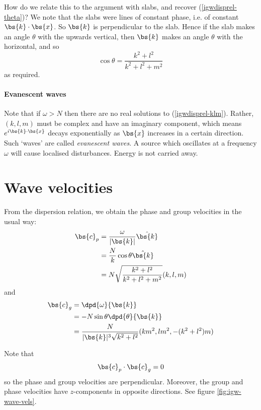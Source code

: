 How do we relate this to the argument with slabs, and recover
(\ref{igwdisprel-theta})? We note that the slabs were lines of constant phase,
i.e. of constant $\bs{k}\cdot\bs{x}$. So $\bs{k}$ is perpendicular to the slab.
Hence if the slab makes an angle $\theta$ with the upwards vertical, then
$\bs{k}$ makes an angle $\theta$ with the horizontal, and so
\begin{equation}
	\cos\theta = \frac{k^2+l^2}{k^2+l^2+m^2}
\end{equation}
as required. 

\paragraph{Evanescent waves}
Note that if $\omega > N$ then there are no real solutions to
(\ref{igwdisprel-klm}). Rather, $(k,l,m)$ must be complex and have an imaginary
component, which means $e^{i\bs{k}\cdot\bs{x}}$ decays exponentially as $\bs{x}$
increases in a certain direction. Such `waves' are called \textit{evanescent
waves}. A source which oscillates at a frequency $\omega$ will cause localised
disturbances. Energy is not carried away.

\section{Wave velocities}

From the dispersion relation, we obtain the phase and group velocities in the usual way:
\begin{align}
	\bs{c}_p &= \frac{\omega}{|\bs{k}|} \hat{\bs{k}} \\
		&= \frac{N}{k}\cos\theta \hat{\bs{k}} \\
		&= N \sqrt{\frac{k^2+l^2}{k^2+l^2+m^2}} (k,l,m)
\end{align}
and
\begin{align}
	\bs{c}_g &= \dpd{\omega}{\bs{k}} \\
		&= -N \sin\theta \dpd{\theta}{\bs{k}}\\
		&=\frac{N}{|\bs{k}|^3 \sqrt{k^2+l^2}} (km^2,lm^2,-(k^2+l^2)m)
\end{align}

Note that 
\begin{equation}
	\bs{c}_p\cdot\bs{c}_g = 0
\end{equation}
so the phase and group velocities are perpendicular. Moreover, the group and
phase velocities have $z$-components in opposite directions. See figure
\ref{fig:igw-wave-vels}.

